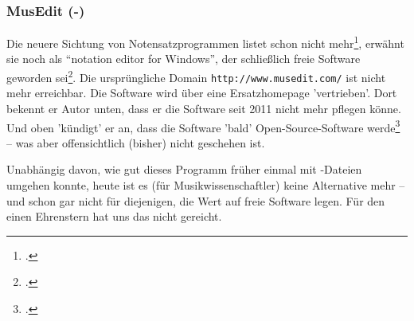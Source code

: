 %
%
%




\subsubsection{MusEdit (-)}

\label{MusEdit}Die neuere Sichtung von Notensatzprogrammen listet 
schon nicht mehr\footcite[vgl.][\nopage wp]{WpedNotensatz2019a}, 
erwähnt sie noch als \enquote{notation editor for Windows}, der schließlich
freie Software geworden sei\footcite[vgl.][\nopage wp]{MusicXML2018b}. Die
ursprüngliche Domain \texttt{http://www.musedit.com/} ist nicht mehr erreichbar.
Die Software wird über eine Ersatzhomepage 'vertrieben'. Dort  bekennt er Autor
unten, dass er die Software seit 2011 nicht mehr pflegen könne. Und oben
'kündigt' er an, dass die Software 'bald' Open-Source-Software
werde\footcite[vgl.][\nopage wp]{Rogers2011a} -- was aber offensichtlich
(bisher) nicht geschehen ist.

Unabhängig davon, wie gut dieses Programm früher einmal mit
-Dateien umgehen konnte, heute ist es (für Musikwissenschaftler)
keine Alternative mehr -- und schon gar nicht für diejenigen, die Wert auf freie
Software legen. Für den einen Ehrenstern hat uns das nicht gereicht.

%
